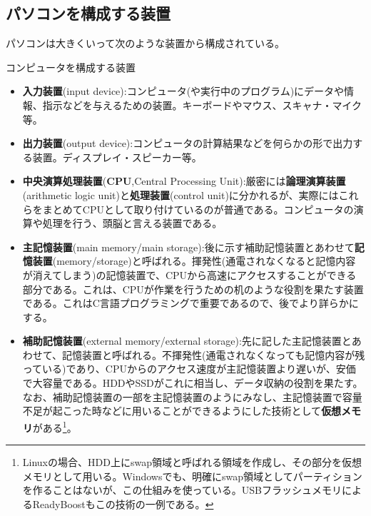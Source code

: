 \subsection{パソコンを構成する装置}
パソコンは大きくいって次のような装置から構成されている。
\begin{itembox}[l]{コンピュータを構成する装置}
\begin{itemize}
\item \textbf{入力装置}(input device):コンピュータ(や実行中のプログラム)にデータや情報、指示などを与えるための装置。キーボードやマウス、スキャナ・マイク等。
\item \textbf{出力装置}(output device):コンピュータの計算結果などを何らかの形で出力する装置。ディスプレイ・スピーカー等。
\item \textbf{中央演算処理装置}(\textbf{CPU},Central Processing Unit):厳密には\textbf{論理演算装置}(arithmetic logic unit)と\textbf{処理装置}(control unit)に分かれるが、実際にはこれらをまとめてCPUとして取り付けているのが普通である。コンピュータの演算や処理を行う、頭脳と言える装置である。
\item \textbf{主記憶装置}(main memory/main storage):後に示す補助記憶装置とあわせて\textbf{記憶装置}(memory/storage)と呼ばれる。揮発性(通電されなくなると記憶内容が消えてしまう)の記憶装置で、CPUから高速にアクセスすることができる部分である。これは、CPUが作業を行うための机のような役割を果たす装置である。これはC言語プログラミングで重要であるので、後でより詳らかにする。
\item \textbf{補助記憶装置}(external memory/external storage):先に記した主記憶装置とあわせて、記憶装置と呼ばれる。不揮発性(通電されなくなっても記憶内容が残っている)であり、CPUからのアクセス速度が主記憶装置より遅いが、安価で大容量である。HDDやSSDがこれに相当し、データ収納の役割を果たす。なお、補助記憶装置の一部を主記憶装置のようにみなし、主記憶装置で容量不足が起こった時などに用いることができるようにした技術として\textbf{仮想メモリ}がある\footnote{Linuxの場合、HDD上にswap領域と呼ばれる領域を作成し、その部分を仮想メモリとして用いる。Windowsでも、明確にswap領域としてパーティションを作ることはないが、この仕組みを使っている。USBフラッシュメモリによるReadyBoostもこの技術の一例である。}。
\end{itemize}
\end{itembox}

